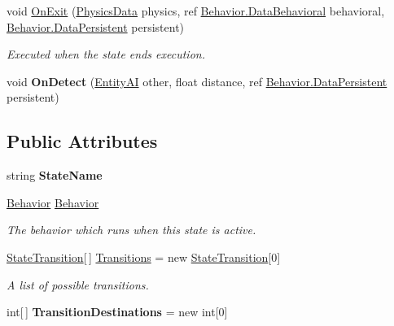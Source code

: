 \begin{DoxyCompactItemize}
\item 
void \hyperlink{class_skyrates_1_1_a_i_1_1_state_1_1_state_a08e5c027f72e207f2db6734ecf7ff8f2}{On\-Exit} (\hyperlink{class_skyrates_1_1_physics_1_1_physics_data}{Physics\-Data} physics, ref \hyperlink{class_skyrates_1_1_a_i_1_1_behavior_1_1_data_behavioral}{Behavior.\-Data\-Behavioral} behavioral, \hyperlink{class_skyrates_1_1_a_i_1_1_behavior_1_1_data_persistent}{Behavior.\-Data\-Persistent} persistent)
\begin{DoxyCompactList}\small\item\em Executed when the state ends execution. \end{DoxyCompactList}\item 
\hypertarget{class_skyrates_1_1_a_i_1_1_state_1_1_state_a26df125ad49ed38b293a75fb6326f93f}{void {\bfseries On\-Detect} (\hyperlink{class_skyrates_1_1_entity_1_1_entity_a_i}{Entity\-A\-I} other, float distance, ref \hyperlink{class_skyrates_1_1_a_i_1_1_behavior_1_1_data_persistent}{Behavior.\-Data\-Persistent} persistent)}\label{class_skyrates_1_1_a_i_1_1_state_1_1_state_a26df125ad49ed38b293a75fb6326f93f}

\end{DoxyCompactItemize}
\subsection*{Public Attributes}
\begin{DoxyCompactItemize}
\item 
\hypertarget{class_skyrates_1_1_a_i_1_1_state_1_1_state_ae3258cfad9d2da7ac6f7fa90bc4da102}{string {\bfseries State\-Name}}\label{class_skyrates_1_1_a_i_1_1_state_1_1_state_ae3258cfad9d2da7ac6f7fa90bc4da102}

\item 
\hyperlink{class_skyrates_1_1_a_i_1_1_behavior}{Behavior} \hyperlink{class_skyrates_1_1_a_i_1_1_state_1_1_state_ab9057a99beb495631ab4ddada1bce031}{Behavior}
\begin{DoxyCompactList}\small\item\em The behavior which runs when this state is active. \end{DoxyCompactList}\item 
\hyperlink{class_skyrates_1_1_a_i_1_1_state_1_1_state_transition}{State\-Transition}\mbox{[}$\,$\mbox{]} \hyperlink{class_skyrates_1_1_a_i_1_1_state_1_1_state_a58cac0e774a7a26577f98bb12093cf41}{Transitions} = new \hyperlink{class_skyrates_1_1_a_i_1_1_state_1_1_state_transition}{State\-Transition}\mbox{[}0\mbox{]}
\begin{DoxyCompactList}\small\item\em A list of possible transitions. \end{DoxyCompactList}\item 
\hypertarget{class_skyrates_1_1_a_i_1_1_state_1_1_state_a69f8a72ba4126b9d7f9a9efa0c8214dc}{int\mbox{[}$\,$\mbox{]} {\bfseries Transition\-Destinations} = new int\mbox{[}0\mbox{]}}\label{class_skyrates_1_1_a_i_1_1_state_1_1_state_a69f8a72ba4126b9d7f9a9efa0c8214dc}

\end{DoxyCompactItemize}


